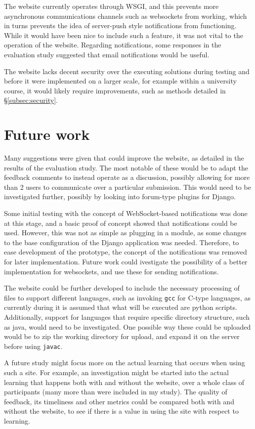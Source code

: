 \documentclass[a4paper,11pt]{report}
\begin{document}
The website currently operates through WSGI, and this prevents more asynchronous communications channels such as websockets from working, which in turns prevents the idea of server-push style notifications from functioning. While it would have been nice to include such a feature, it was not vital to the operation of the website. Regarding notifications, some responses in the evaluation study suggested that email notifications would be useful.\par
The website lacks decent security over the executing solutions during testing and before it were implemented on a larger scale, for example within a university course, it would likely require improvements, such as methods detailed in \S\ref{subsec:security}.\par
\section{Future work}
Many suggestions were given that could improve the website, as detailed in the results of the evaluation study. The most notable of these would be to adapt the feedback comments to instead operate as a discussion, possibly allowing for more than 2 users to communicate over a particular submission. This would need to be investigated further, possibly by looking into forum-type plugins for Django.\par
Some initial testing with the concept of WebSocket-based notifications was done at this stage, and a basic proof of concept showed that notifications could be used. However, this was not as simple as plugging in a module, as some changes to the base configuration of the Django application was needed. Therefore, to ease development of the prototype, the concept of the notifications was removed for later implementation. Future work could ivestigate the possibility of a better implementation for websockets, and use these for sending notifications.\par
The website could be further developed to include the necessary processing of files to support different languages, such as invoking \texttt{gcc} for C-type languages, as currently during it is assumed that what will be executed are python scripts. Additionally, support for languages that require specific directory structure, such as java, would need to be investigated. One possible way these could be uploaded would be to zip the working directory for upload, and expand it on the server before using \texttt{javac}.\par
A future study might focus more on the actual learning that occurs when using such a site. For example, an investigation might be started into the actual learning that happens both with and without the website, over a whole class of participants (many more than were included in my study). The quality of feedback, its timeliness and other metrics could be compared both with and without the website, to see if there is a value in using the site with respect to learning.
\end{document}
